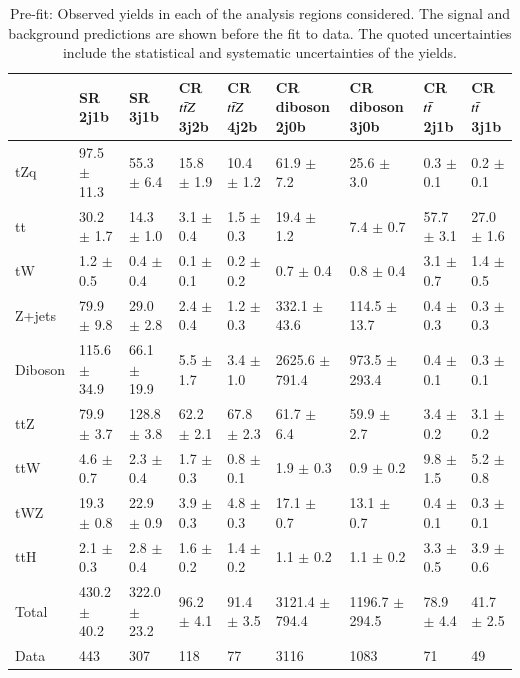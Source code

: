 \begin{table}[h!]
    \centering
    \begin{adjustbox}{width=\textwidth}
    \begin{tabular}{@{} *9l  @{}}
    \toprule
     & SR 2j1b & SR 3j1b & CR $t\Bar{t}Z$ 3j2b & CR $t\Bar{t}Z$ 4j2b & CR diboson 2j0b & CR diboson 3j0b & CR $t\Bar{t}$ 2j1b & CR $t\Bar{t}$ 3j1b \\
\midrule
  tZq   & 97.5 $\pm$ 11.3 & 55.3 $\pm$ 6.4 & 15.8 $\pm$ 1.9 & 10.4 $\pm$ 1.2 & 61.9 $\pm$ 7.2 & 25.6 $\pm$ 3.0 & 0.3 $\pm$ 0.1 & 0.2 $\pm$ 0.1 \\ 
  tt   & 30.2 $\pm$ 1.7 & 14.3 $\pm$ 1.0 & 3.1 $\pm$ 0.4 & 1.5 $\pm$ 0.3 & 19.4 $\pm$ 1.2 & 7.4 $\pm$ 0.7 & 57.7 $\pm$ 3.1 & 27.0 $\pm$ 1.6 \\ 
  tW   & 1.2 $\pm$ 0.5 & 0.4 $\pm$ 0.4 & 0.1 $\pm$ 0.1 & 0.2 $\pm$ 0.2 & 0.7 $\pm$ 0.4 & 0.8 $\pm$ 0.4 & 3.1 $\pm$ 0.7 & 1.4 $\pm$ 0.5 \\ 
  Z+jets   & 79.9 $\pm$ 9.8 & 29.0 $\pm$ 2.8 & 2.4 $\pm$ 0.4 & 1.2 $\pm$ 0.3 & 332.1 $\pm$ 43.6 & 114.5 $\pm$ 13.7 & 0.4 $\pm$ 0.3 & 0.3 $\pm$ 0.3 \\ 
  Diboson   & 115.6 $\pm$ 34.9 & 66.1 $\pm$ 19.9 & 5.5 $\pm$ 1.7 & 3.4 $\pm$ 1.0 & 2625.6 $\pm$ 791.4 & 973.5 $\pm$ 293.4 & 0.4 $\pm$ 0.1 & 0.3 $\pm$ 0.1 \\ 
  ttZ   & 79.9 $\pm$ 3.7 & 128.8 $\pm$ 3.8 & 62.2 $\pm$ 2.1 & 67.8 $\pm$ 2.3 & 61.7 $\pm$ 6.4 & 59.9 $\pm$ 2.7 & 3.4 $\pm$ 0.2 & 3.1 $\pm$ 0.2 \\ 
  ttW   & 4.6 $\pm$ 0.7 & 2.3 $\pm$ 0.4 & 1.7 $\pm$ 0.3 & 0.8 $\pm$ 0.1 & 1.9 $\pm$ 0.3 & 0.9 $\pm$ 0.2 & 9.8 $\pm$ 1.5 & 5.2 $\pm$ 0.8 \\ 
  tWZ   & 19.3 $\pm$ 0.8 & 22.9 $\pm$ 0.9 & 3.9 $\pm$ 0.3 & 4.8 $\pm$ 0.3 & 17.1 $\pm$ 0.7 & 13.1 $\pm$ 0.7 & 0.4 $\pm$ 0.1 & 0.3 $\pm$ 0.1 \\ 
  ttH   & 2.1 $\pm$ 0.3 & 2.8 $\pm$ 0.4 & 1.6 $\pm$ 0.2 & 1.4 $\pm$ 0.2 & 1.1 $\pm$ 0.2 & 1.1 $\pm$ 0.2 & 3.3 $\pm$ 0.5 & 3.9 $\pm$ 0.6 \\ 
\midrule
  Total  & 430.2 $\pm$ 40.2 & 322.0 $\pm$ 23.2 & 96.2 $\pm$ 4.1 & 91.4 $\pm$ 3.5 & 3121.4 $\pm$ 794.4 & 1196.7 $\pm$ 294.5 & 78.9 $\pm$ 4.4 & 41.7 $\pm$ 2.5 \\ 
\midrule 
  Data   & 443 & 307 & 118 & 77 & 3116 & 1083 & 71 & 49 \\ 
      \bottomrule
 \end{tabular}
 \end{adjustbox}
 \caption{Pre-fit: Observed yields in each of the analysis regions considered. The signal and background predictions are shown before the fit to data. The quoted uncertainties include the statistical and systematic uncertainties of the yields.}
 \label{tab:prefityield}
 \end{table}

